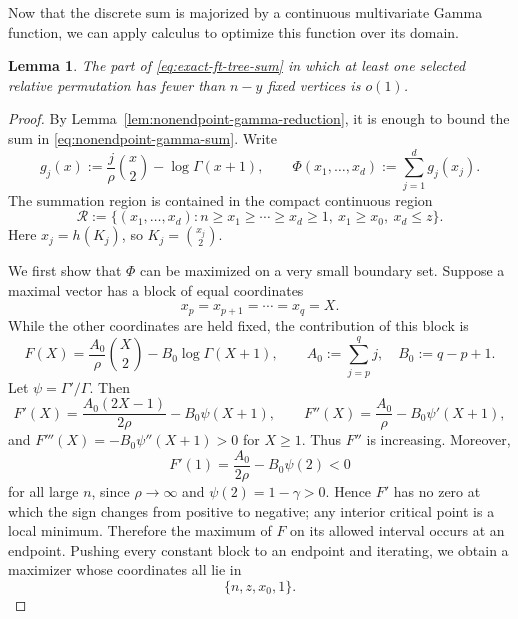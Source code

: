 \documentclass[11pt,reqno]{amsart}
\newtheorem{lemma}[theorem]{Lemma}
\theoremstyle{definition}
\theoremstyle{remark}
\renewcommand\le{\leqslant}
\renewcommand\ge{\geqslant}
\renewcommand\to{\rightarrow}
\begin{document}
Now that the discrete sum is majorized by a continuous multivariate Gamma function, we can apply calculus to optimize this function over its domain. 


\begin{lemma}\label{lem:nonendpoint-contribution-detailed}
The part of \eqref{eq:exact-ft-tree-sum} in which at least one selected relative permutation has fewer than $n-y$ fixed vertices is $o(1)$.
\end{lemma}

\begin{proof}
By Lemma~\ref{lem:nonendpoint-gamma-reduction}, it is enough to bound the sum in \eqref{eq:nonendpoint-gamma-sum}. Write
\[
        g_j(x):=\frac{j}{\rho}\binom{x}{2}-\log\Gamma(x+1),
        \qquad
        \Phi(x_1,\ldots,x_d):=\sum_{j=1}^d g_j(x_j).
\]
The summation region is contained in the compact continuous region
\begin{equation}\label{eq:continuous-region}
        \mathcal R:=\{(x_1,\ldots,x_d):
        n\ge x_1\ge\cdots\ge x_d\ge1,
        \ x_1\ge x_0,
        \ x_d\le z\}.
\end{equation}
Here $x_j=h(K_j)$, so $K_j=\binom{x_j}{2}$.

We first show that $\Phi$ can be maximized on a very small boundary set. Suppose a maximal vector has a block of equal coordinates
\[
        x_p=x_{p+1}=\cdots=x_q=X.
\]
While the other coordinates are held fixed, the contribution of this block is
\[
        F(X)=\frac{A_0}{\rho}\binom X2-B_0\log\Gamma(X+1),
        \qquad
        A_0:=\sum_{j=p}^q j,
        \quad B_0:=q-p+1.
\]
Let $\psi=\Gamma'/\Gamma$. Then
\[
        F'(X)=\frac{A_0(2X-1)}{2\rho}-B_0\psi(X+1),
        \qquad
        F''(X)=\frac{A_0}{\rho}-B_0\psi'(X+1),
\]
and $F'''(X)=-B_0\psi''(X+1)>0$ for $X\ge1$. Thus $F''$ is increasing. Moreover,
\[
        F'(1)=\frac{A_0}{2\rho}-B_0\psi(2)<0
\]
for all large $n$, since $\rho\to\infty$ and $\psi(2)=1-\gamma>0$. Hence $F'$ has no zero at which the sign changes from positive to negative; any interior critical point is a local minimum. Therefore the maximum of $F$ on its allowed interval occurs at an endpoint. Pushing every constant block to an endpoint and iterating, we obtain a maximizer whose coordinates all lie in
\begin{equation}\label{eq:boundary-set}
        \{n,z,x_0,1\}.
\end{equation}


\end{proof}
\end{document}
